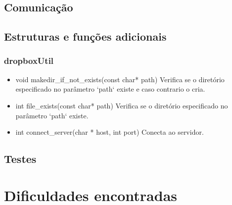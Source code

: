 \documentclass[a4paper]{article}
\begin{document}
\subsection{Comunicação}

\subsection{Estruturas e funções adicionais}

\subsubsection{dropboxUtil}
\begin{itemize}
	\item void makedir\_if\_not\_exists(const char* path)
	\newline Verifica se o diretório especificado no parâmetro `path` existe e caso contrario o cria.
	
	\item int file\_exists(const char* path)
	\newline Verifica se o diretório especificado no parâmetro `path` existe.

	\item int connect\_server(char * host, int port)
	\newline Conecta ao servidor.
	
	
	
	
	
	
	
	
	
	
	
	
	
	
\end{itemize}
\subsection{Testes}

\section{Dificuldades encontradas}
 


\end{document}
